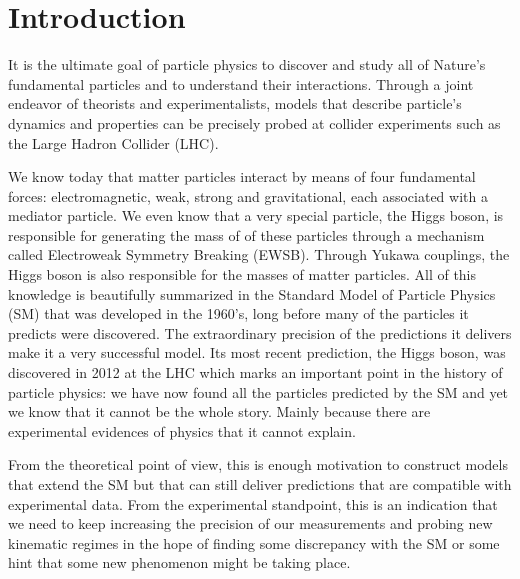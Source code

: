 
\chapter{Introduction}
\label{chapter:introduction}

It is the ultimate goal of particle physics to discover and study all of Nature's fundamental particles and to understand their interactions. Through a joint endeavor of theorists and experimentalists, models that describe particle's dynamics and properties can be precisely probed at collider experiments such as the Large Hadron Collider (LHC). 

We know today that matter particles interact by means of four fundamental forces: electromagnetic, weak, strong and gravitational, each associated with a mediator particle. We even know that a very special particle, the Higgs boson, is responsible for generating the mass of of these particles through a mechanism called Electroweak Symmetry Breaking (EWSB). Through Yukawa couplings, the Higgs boson is also responsible for the masses of matter particles. All of this knowledge is beautifully summarized in the Standard Model of Particle Physics (SM) that was developed in the 1960's, long before many of the particles it predicts were discovered. The extraordinary precision of the predictions it delivers make it a very successful model. Its most recent prediction, the Higgs boson, was discovered in 2012 at the LHC which marks an important point in the history of particle physics: we have now found all the particles predicted by the SM and yet we know that it cannot be the whole story. Mainly because there are experimental evidences of physics that it cannot explain.

From the theoretical point of view, this is enough motivation to construct models that extend the SM but that can still deliver predictions that are compatible with experimental data. From the experimental standpoint, this is an indication that we need to keep increasing the precision of our measurements and probing new kinematic regimes in the hope of finding some discrepancy with the SM or some hint that some new phenomenon might be taking place.

